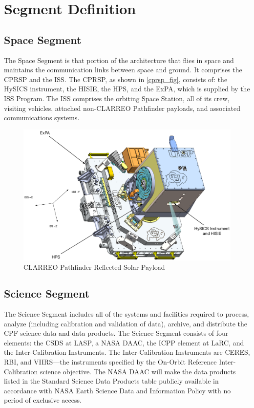\documentclass[12pt,oneside,oldfontcommands]{memoir}
\begin{document}
\section{Segment Definition }
\label{segmentdefinition}

\subsection{Space Segment }
\label{spacesegment}

The Space Segment is that portion of the architecture that flies in space and maintains the communication links between space and ground. It comprises the \gls{CPRSP} and the \gls{ISS}. The \gls{CPRSP}, as shown in \autoref{cprsp_fig}, consists of: the \gls{HySICS} instrument, the \gls{HISIE}, the \gls{HPS}, and the \gls{ExPA}, which is supplied by the \gls{ISS} Program. The \gls{ISS} comprises the orbiting Space Station, all of its crew, visiting vehicles, attached non-\gls{CLARREO} Pathfinder payloads, and associated communications systems.

\begin{figure}[htbp]
\centering
\includegraphics[keepaspectratio,width=6.5in,height=0.75\textheight]{20170614_cprsp_cad.pdf}
\caption{\gls{CLARREO} Pathfinder Reflected Solar Payload}
\label{cprsp_fig}
\end{figure}

\subsection{Science Segment }
\label{sciencesegment}

The Science Segment includes all of the systems and facilities required to process, analyze (including calibration and validation of data), archive, and distribute the \gls{CPF} science data and data products. The Science Segment consists of four elements: the \gls{CSDS} at \gls{LASP}, a NASA \gls{DAAC}, the \gls{ICPP} element at \gls{LaRC}, and the Inter-Calibration Instruments. The Inter-Calibration Instruments are \gls{CERES}, \gls{RBI}, and \gls{VIIRS}---the instruments specified by the On-Orbit Reference Inter-Calibration science objective. The NASA \gls{DAAC} will make the data products listed in the Standard Science Data Products table publicly available in accordance with NASA Earth Science Data and Information Policy with no period of exclusive access.
\end{document}
